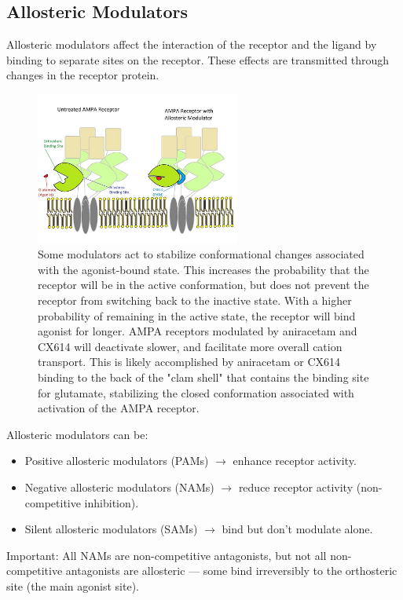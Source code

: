 \documentclass{book}
\begin{document}
\subsection{Allosteric Modulators}
Allosteric modulators affect the interaction of the receptor and the ligand by binding to separate
sites on the receptor. 
These effects are transmitted through changes in the receptor protein.

\begin{figure}[H]
    \includegraphics[width=0.6\textwidth, center]{images/image22.png}
    \caption{Some modulators act to stabilize conformational changes associated with the agonist-bound state. This increases the probability that the receptor will be in the active conformation, but does not prevent the receptor from switching back to the inactive state. With a higher probability of remaining in the active state, the receptor will bind agonist for longer. AMPA receptors modulated by aniracetam and CX614 will deactivate slower, and facilitate more overall cation transport. This is likely accomplished by aniracetam or CX614 binding to the back of the "clam shell" that contains the binding site for glutamate, stabilizing the closed conformation associated with activation of the AMPA receptor.}
\end{figure}

Allosteric modulators can be:

\begin{itemize}
    \item Positive allosteric modulators (PAMs) $\rightarrow$ enhance receptor activity.
    \item Negative allosteric modulators (NAMs) $\rightarrow$ reduce receptor activity (non-competitive inhibition).
    \item Silent allosteric modulators (SAMs) $\rightarrow$ bind but don’t modulate alone.
\end{itemize}

Important: All NAMs are non-competitive antagonists, but not all non-competitive antagonists are allosteric — some bind irreversibly to the orthosteric site (the main agonist site).
\end{document}
